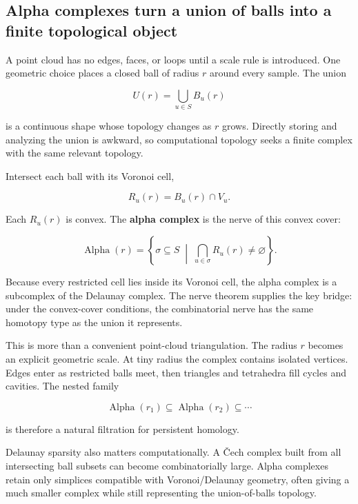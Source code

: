 \subsection{Alpha complexes turn a union of balls into a finite topological object}\label{03-visual-computing-i-ch002-alpha-complexes-turn-a-union-of-balls-into-a-finite-topological-object}

\hypertarget{03-visual-computing-i-ch002-alpha-complexes-turn-a-union-of-balls-into-a-finite-topological-object}{}

A point cloud has no edges, faces, or loops until a scale rule is introduced. One geometric choice places a closed ball of radius \(r\) around every sample. The union

\[
U(r)=
\bigcup_{u\in S} B_u(r)
\]

is a continuous shape whose topology changes as \(r\) grows. Directly storing and analyzing the union is awkward, so computational topology seeks a finite complex with the same relevant topology.

Intersect each ball with its Voronoi cell,

\[
R_u(r)
=
B_u(r)\cap V_u.
\]

Each \(R_u(r)\) is convex. The \textbf{alpha complex} is the nerve of this convex cover:

\[
\operatorname{Alpha}(r)
=
\left\{
\sigma\subseteq S
\;\middle|\;
\bigcap_{u\in\sigma}R_u(r)\neq\varnothing
\right\}.
\]

Because every restricted cell lies inside its Voronoi cell, the alpha complex is a subcomplex of the Delaunay complex. The nerve theorem supplies the key bridge: under the convex-cover conditions, the combinatorial nerve has the same homotopy type as the union it represents.

This is more than a convenient point-cloud triangulation. The radius \(r\) becomes an explicit geometric scale. At tiny radius the complex contains isolated vertices. Edges enter as restricted balls meet, then triangles and tetrahedra fill cycles and cavities. The nested family

\[
\operatorname{Alpha}(r_1)
\subseteq
\operatorname{Alpha}(r_2)
\subseteq\cdots
\]

is therefore a natural filtration for persistent homology.

Delaunay sparsity also matters computationally. A Čech complex built from all intersecting ball subsets can become combinatorially large. Alpha complexes retain only simplices compatible with Voronoi/Delaunay geometry, often giving a much smaller complex while still representing the union-of-balls topology.

